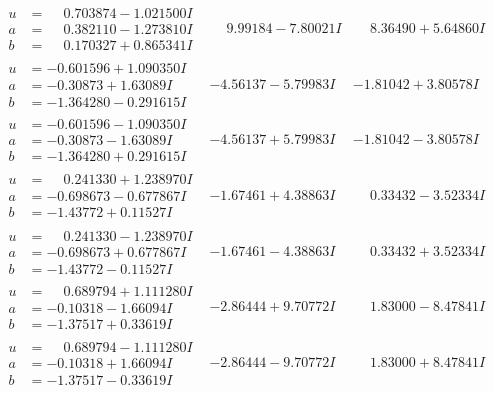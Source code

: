 \documentclass[1p]{elsarticle_modified}
\theoremstyle{definition}
\begin{document}
$$\begin{array}{c|c|c}
\begin{aligned}
u &= \phantom{-}0.703874 - 1.021500 I \\
a &= \phantom{-}0.382110 - 1.273810 I \\
b &= \phantom{-}0.170327 + 0.865341 I\end{aligned}
 & \phantom{-}9.99184 - 7.80021 I & \phantom{-}8.36490 + 5.64860 I \\ \hline\begin{aligned}
u &= -0.601596 + 1.090350 I \\
a &= -0.30873 + 1.63089 I \\
b &= -1.364280 - 0.291615 I\end{aligned}
 & -4.56137 - 5.79983 I & -1.81042 + 3.80578 I \\ \hline\begin{aligned}
u &= -0.601596 - 1.090350 I \\
a &= -0.30873 - 1.63089 I \\
b &= -1.364280 + 0.291615 I\end{aligned}
 & -4.56137 + 5.79983 I & -1.81042 - 3.80578 I \\ \hline\begin{aligned}
u &= \phantom{-}0.241330 + 1.238970 I \\
a &= -0.698673 - 0.677867 I \\
b &= -1.43772 + 0.11527 I\end{aligned}
 & -1.67461 + 4.38863 I & \phantom{-}0.33432 - 3.52334 I \\ \hline\begin{aligned}
u &= \phantom{-}0.241330 - 1.238970 I \\
a &= -0.698673 + 0.677867 I \\
b &= -1.43772 - 0.11527 I\end{aligned}
 & -1.67461 - 4.38863 I & \phantom{-}0.33432 + 3.52334 I \\ \hline\begin{aligned}
u &= \phantom{-}0.689794 + 1.111280 I \\
a &= -0.10318 - 1.66094 I \\
b &= -1.37517 + 0.33619 I\end{aligned}
 & -2.86444 + 9.70772 I & \phantom{-}1.83000 - 8.47841 I \\ \hline\begin{aligned}
u &= \phantom{-}0.689794 - 1.111280 I \\
a &= -0.10318 + 1.66094 I \\
b &= -1.37517 - 0.33619 I\end{aligned}
 & -2.86444 - 9.70772 I & \phantom{-}1.83000 + 8.47841 I \\ \hline\begin{aligned}

\end{aligned}
\end{array}$$
\end{document}
